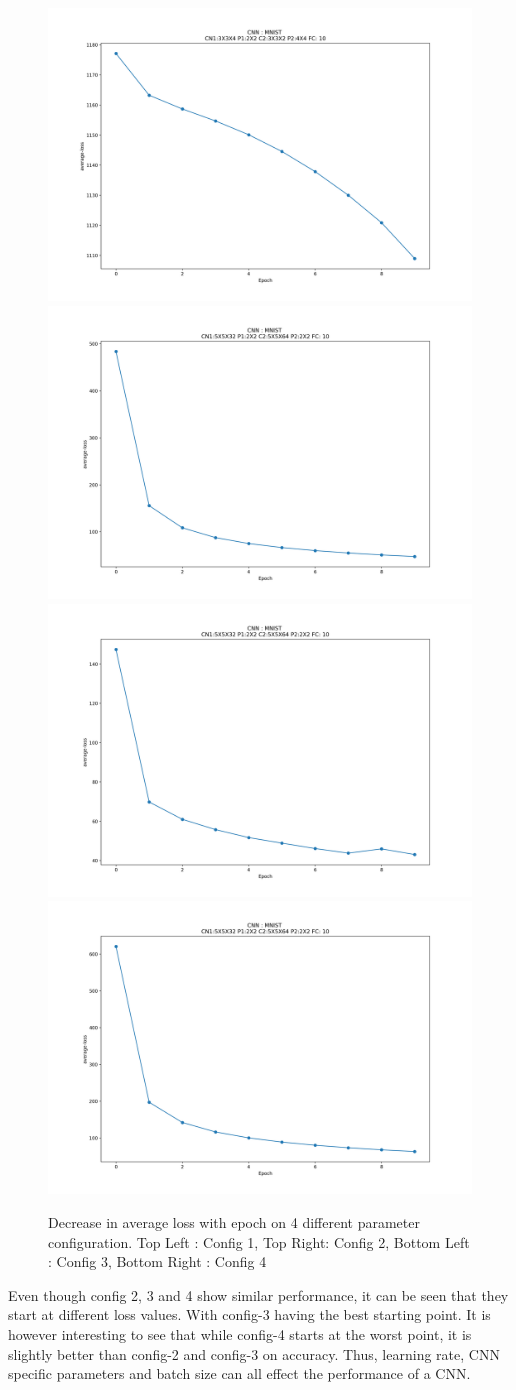 \documentclass[12pt]{article}
\begin{document}
\begin{figure}
\begin{minipage}{\linewidth}
\includegraphics[width=0.5\linewidth]{MNIST-loss-decrease-CNNstandard.png}
\includegraphics[width=0.5\linewidth]{MNIST-loss-decrease-CNNnotes-w-batch100.png}
\includegraphics[width=0.5\linewidth]{MNIST-loss-decrease-CNNnotes-w-batch-100-lr-change.png}
\includegraphics[width=0.5\linewidth]{MNIST-loss-decrease-CNNnotes-w-batch64.png}
\end{minipage}
\caption{Decrease in average loss with epoch on 4 different parameter configuration. Top Left : Config 1, Top Right: Config 2,
Bottom Left : Config 3, Bottom Right : Config 4}
\label{fig-3}
\end{figure}

Even though config 2, 3 and 4 show similar performance, it can be seen that they start at different loss values. With config-3 having the best starting point. It is however interesting to see that while config-4 starts at the worst point, it is slightly better than config-2 and config-3 on accuracy. Thus, learning rate, CNN specific parameters and batch size can all effect the performance of a CNN. 
\end{document}
